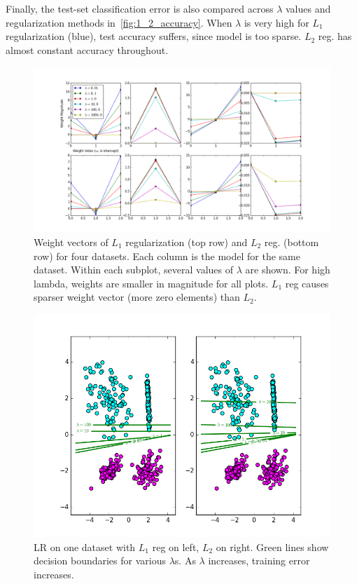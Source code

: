 Finally, the test-set classification error is also compared across $\lambda$ values and regularization methods in~\cref{fig:1_2_accuracy}.
When $\lambda$ is very high for $L_1$ regularization (blue), test accuracy suffers, since model is too sparse.
$L_2$ reg. has almost constant accuracy throughout.


\begin{figure}
	\centering
	\includegraphics [trim=0 0 0 0, clip, angle=0, width=0.8\columnwidth,
	keepaspectratio]{figures/1_2_all_weights_good}
	\caption{Weight vectors of $L_1$ regularization (top row) and $L_2$ reg. (bottom row) for four datasets. Each column is the model for the same dataset. Within each subplot, several values of $\lambda$ are shown. For high lambda, weights are smaller in magnitude for all plots. $L_1$ reg causes sparser weight vector (more zero elements) than $L_2$.}
	\label{fig:1_2_all_weights_good} 
\end{figure}

\begin{figure}
	\centering
	\includegraphics [trim=0 0 0 0, clip, angle=0, width=0.8\columnwidth,
	keepaspectratio]{figures/1_2_decision}
	\caption{LR on one dataset with $L_1$ reg on left, $L_2$ on right. Green lines show decision boundaries for various $\lambda$s. As $\lambda$ increases, training error increases.} 
	\label{fig:1_2_decision} 
\end{figure}

